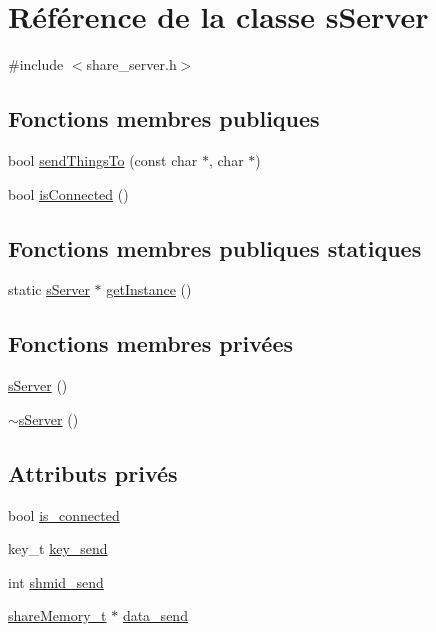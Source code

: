 \hypertarget{classsServer}{\section{Référence de la classe s\-Server}
\label{classsServer}
}


{\ttfamily \#include $<$share\-\_\-server.\-h$>$}

\subsection*{Fonctions membres publiques}
\begin{DoxyCompactItemize}
\item 
bool \hyperlink{classsServer_abcd4016d1b93c045f0847a48afee0ac2}{send\-Things\-To} (const char $\ast$, char $\ast$)
\item 
bool \hyperlink{classsServer_a62561438ad0563d99bf05e84795807f9}{is\-Connected} ()
\end{DoxyCompactItemize}
\subsection*{Fonctions membres publiques statiques}
\begin{DoxyCompactItemize}
\item 
static \hyperlink{classsServer}{s\-Server} $\ast$ \hyperlink{classsServer_af98a4a292c1beaab9296a88dba9f0c13}{get\-Instance} ()
\end{DoxyCompactItemize}
\subsection*{Fonctions membres privées}
\begin{DoxyCompactItemize}
\item 
\hyperlink{classsServer_ade1889963bc8ec1d6c184f900f1c4977}{s\-Server} ()
\item 
\hyperlink{classsServer_a1c9ed39e48d26a4ed531741979ced7bd}{$\sim$s\-Server} ()
\end{DoxyCompactItemize}
\subsection*{Attributs privés}
\begin{DoxyCompactItemize}
\item 
bool \hyperlink{classsServer_adeee5a2ac165a0d9df35757d2ddfc70d}{is\-\_\-connected}
\item 
key\-\_\-t \hyperlink{classsServer_a9300a483fb708e2e0208d5e1e53e0c97}{key\-\_\-send}
\item 
int \hyperlink{classsServer_ab7c99a899b82ac73c36c30da01ab7944}{shmid\-\_\-send}
\item 
\hyperlink{share__server_8h_ad73ea60fc164d7d224a2499bd77a1f35}{share\-Memory\-\_\-t} $\ast$ \hyperlink{classsServer_ad24c799f06a327db74a17fd30c78eff5}{data\-\_\-send}
\end{DoxyCompactItemize}
